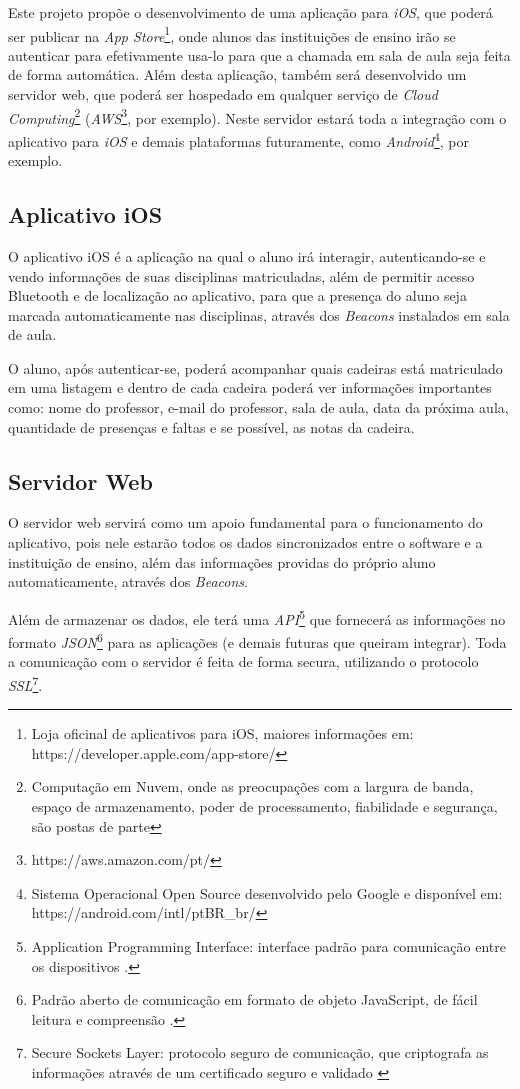 \documentclass[
	12pt,
	oneside,
	a4paper,
	english,
	brazil,
]{abntex2}
\begin{document}
Este projeto propõe o desenvolvimento de uma aplicação para \emph{iOS}, que poderá ser publicar na \emph{App Store}\footnote{Loja oficinal de aplicativos para iOS, maiores informações em: https://developer.apple.com/app-store/}, onde alunos das instituições de ensino irão se autenticar para efetivamente usa-lo para que a chamada em sala de aula seja feita de forma automática. Além desta aplicação, também será desenvolvido um servidor web, que poderá ser hospedado em qualquer serviço de \emph{Cloud Computing}\footnote{Computação em Nuvem, onde as preocupações com a largura de banda, espaço de armazenamento, poder de processamento, fiabilidade e segurança, são postas de parte\cite{cloud-computing-about}} (\emph{AWS}\footnote{https://aws.amazon.com/pt/}, por exemplo). Neste servidor estará toda a integração com o aplicativo para \emph{iOS} e demais plataformas futuramente, como \emph{Android}\footnote{Sistema Operacional Open Source desenvolvido pelo Google e disponível em: https://android.com/intl/pt\-BR\_br/}, por exemplo.

\subsection{Aplicativo iOS}

O aplicativo iOS é a aplicação na qual o aluno irá interagir, autenticando-se e vendo informações de suas disciplinas matriculadas, além de permitir acesso Bluetooth e de localização ao aplicativo, para que a presença do aluno seja marcada automaticamente nas disciplinas, através dos \emph{Beacons} instalados em sala de aula.

O aluno, após autenticar-se, poderá acompanhar quais cadeiras está matriculado em uma listagem e dentro de cada cadeira poderá ver informações importantes como: nome do professor, e-mail do professor, sala de aula, data da próxima aula, quantidade de presenças e faltas e se possível, as notas da cadeira.

\subsection{Servidor Web}

O servidor web servirá como um apoio fundamental para o funcionamento do aplicativo, pois nele estarão todos os dados sincronizados entre o software e a instituição de ensino, além das informações providas do próprio aluno automaticamente, através dos \emph{Beacons}.

Além de armazenar os dados, ele terá uma \emph{API}\footnote{Application Programming Interface: interface padrão para comunicação entre os dispositivos \cite{footnote-api}.} que fornecerá as informações no formato \emph{JSON}\footnote{Padrão aberto de comunicação em formato de objeto JavaScript, de fácil leitura e compreensão \cite{footnote-json}.} para as aplicações (e demais futuras que queiram integrar). Toda a comunicação com o servidor é feita de forma secura, utilizando o protocolo \emph{SSL}\footnote{Secure Sockets Layer: protocolo seguro de comunicação, que criptografa as informações através de um certificado seguro e validado \cite{footnote-ssl}}. 
\end{document}
